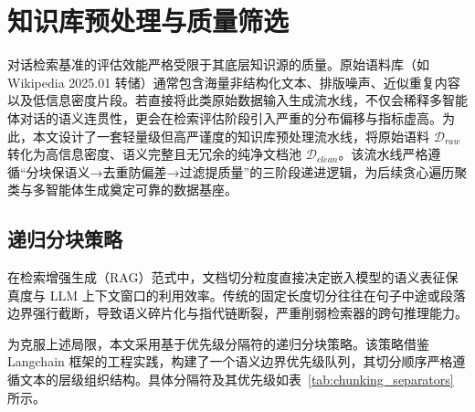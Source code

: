 \section{知识库预处理与质量筛选}

\label{sec:kb_curation}



对话检索基准的评估效能严格受限于其底层知识源的质量。原始语料库（如 Wikipedia 2025.01 转储）通常包含海量非结构化文本、排版噪声、近似重复内容以及低信息密度片段。若直接将此类原始数据输入生成流水线，不仅会稀释多智能体对话的语义连贯性，更会在检索评估阶段引入严重的分布偏移与指标虚高。为此，本文设计了一套轻量级但高严谨度的知识库预处理流水线，将原始语料 $\mathcal{D}_{raw}$ 转化为高信息密度、语义完整且无冗余的纯净文档池 $\mathcal{D}_{clean}$。该流水线严格遵循“分块保语义→去重防偏差→过滤提质量”的三阶段递进逻辑，为后续贪心遍历聚类与多智能体生成奠定可靠的数据基座。



\subsection{递归分块策略}

\label{subsec:recursive_chunking}



在检索增强生成（RAG）范式中，文档切分粒度直接决定嵌入模型的语义表征保真度与 LLM 上下文窗口的利用效率。传统的固定长度切分往往在句子中途或段落边界强行截断，导致语义碎片化与指代链断裂，严重削弱检索器的跨句推理能力。



为克服上述局限，本文采用基于优先级分隔符的递归分块策略。该策略借鉴 Langchain 框架的工程实践，构建了一个语义边界优先级队列，其切分顺序严格遵循文本的层级组织结构。具体分隔符及其优先级如表~\ref{tab:chunking_separators} 所示。



